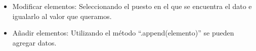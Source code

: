 \begin{itemize}
    \item Modificar elementos: Seleccionando el puesto en el que se encuentra el dato e igualarlo al valor que queramos.
    \begin{figure}[h]
        \centering
      \end{figure}
    
    \item Añadir elementos: Utilizando el método ``.append(elemento)'' se pueden agregar datos.
    \begin{figure}[h]
        \centering
      \end{figure}
    

\end{itemize}
